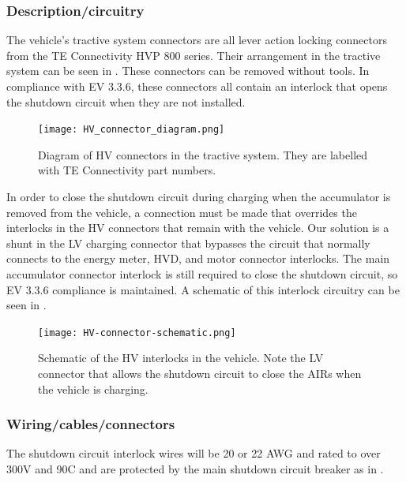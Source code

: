 \documentclass{article}
\begin{document}
\subsubsection{Description/circuitry}
The vehicle's tractive system connectors are all lever action locking connectors from the TE Connectivity HVP 800 series. Their arrangement in the tractive system can be seen in . These connectors can be removed without tools. In compliance with EV 3.3.6, these connectors all contain an interlock that opens the shutdown circuit when they are not installed. 

  \begin{figure}[H]
        \centering
        \texttt{[image: HV\_connector\_diagram.png]}
        \caption{Diagram of HV connectors in the tractive system. They are labelled with TE Connectivity part numbers.}
        \label{fig:HV_connector_diagram}
  \end{figure}

In order to close the shutdown circuit during charging when the accumulator is removed from the vehicle, a connection must be made that overrides the interlocks in the HV connectors that remain with the vehicle. Our solution is a shunt in the LV charging connector that bypasses the circuit that normally connects to the energy meter, HVD, and motor connector interlocks. The main accumulator connector interlock is still required to close the shutdown circuit, so EV 3.3.6 compliance is maintained. A schematic of this interlock circuitry can be seen in .

\begin{figure}[H]
\centering
\texttt{[image: HV-connector-schematic.png]}
\caption{Schematic of the HV interlocks in the vehicle. Note the LV connector that allows the shutdown circuit to close the AIRs when the vehicle is charging.}
\label{fig:HV_connector_schematic}
\end{figure}

\subsubsection{Wiring/cables/connectors}
The shutdown circuit interlock wires will be 20 or 22 AWG and rated to over 300V and 90\textdegree C and are protected by the main shutdown circuit breaker as in . 
\end{document}
